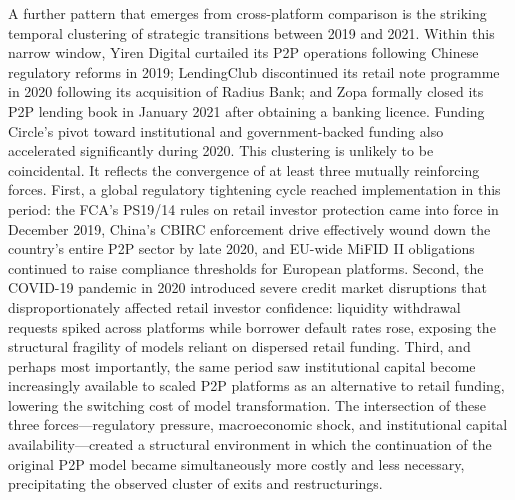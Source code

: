 \documentclass[pdflatex,sn-apa]{sn-jnl}%
\theoremstyle{thmstyleone}%
\theoremstyle{thmstyletwo}%
\theoremstyle{thmstylethree}%
\begin{document}
\textcolor{NavyBlue}{
A further pattern that emerges from cross-platform comparison is the striking temporal clustering of strategic transitions between 2019 and 2021. Within this narrow window, Yiren Digital curtailed its P2P operations following Chinese regulatory reforms in 2019; LendingClub discontinued its retail note programme in 2020 following its acquisition of Radius Bank; and Zopa formally closed its P2P lending book in January 2021 after obtaining a banking licence. Funding Circle's pivot toward institutional and government-backed funding also accelerated significantly during 2020. This clustering is unlikely to be coincidental. It reflects the convergence of at least three mutually reinforcing forces. First, a global regulatory tightening cycle reached implementation in this period: the FCA's PS19/14 rules on retail investor protection came into force in December 2019, China's CBIRC enforcement drive effectively wound down the country's entire P2P sector by late 2020, and EU-wide MiFID II obligations continued to raise compliance thresholds for European platforms. Second, the COVID-19 pandemic in 2020 introduced severe credit market disruptions that disproportionately affected retail investor confidence: liquidity withdrawal requests spiked across platforms while borrower default rates rose, exposing the structural fragility of models reliant on dispersed retail funding. Third, and perhaps most importantly, the same period saw institutional capital become increasingly available to scaled P2P platforms as an alternative to retail funding, lowering the switching cost of model transformation. The intersection of these three forces—regulatory pressure, macroeconomic shock, and institutional capital availability—created a structural environment in which the continuation of the original P2P model became simultaneously more costly and less necessary, precipitating the observed cluster of exits and restructurings.
}
\end{document}
